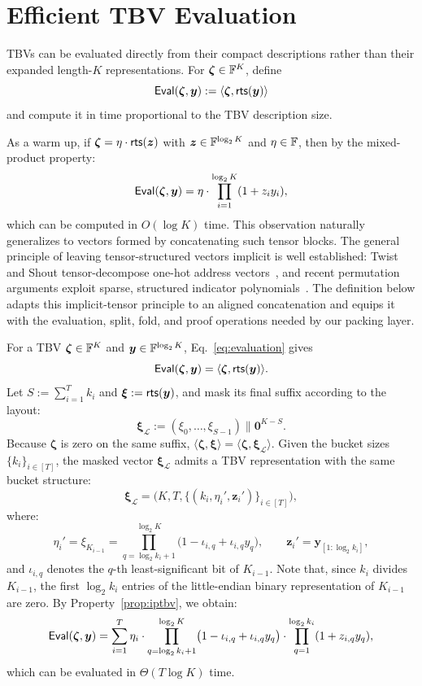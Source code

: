 \section{Efficient TBV Evaluation}
\label{sec:tbveval}

TBVs can be evaluated directly from their compact descriptions rather than
their expanded length-$K$ representations.  For
$\bm{\zeta}\in{\mathbb{F}}^K$, define
\[
{\sf Eval}(\bm{\zeta},\bm{y})
:= \langle \bm{\zeta}, {\sf rts}(\bm{y}) \rangle
\]
and compute it in time proportional to the TBV description size.

As a warm up, if $\bm{\zeta}=\eta\cdot{\sf rts}(\bm{z})$ with
$\bm{z}\in{\mathbb{F}}^{\log_2 K}$ and $\eta\in{\mathbb{F}}$, then by the mixed-product property:
\[
{\sf Eval}(\bm{\zeta},\bm{y})
=
\eta\cdot\prod_{i=1}^{\log_2 K}(1+z_i y_i),
\]
which can be computed in $O(\log K)$ time.
This observation naturally generalizes to vectors formed by concatenating such
tensor blocks.  The general principle of leaving tensor-structured vectors
implicit is well established: Twist and Shout tensor-decompose one-hot address
vectors~\cite{iacr/SettyT25}, and recent permutation arguments exploit sparse,
structured indicator polynomials~\cite{iacr/BunzCDC25}.  The definition below
adapts this implicit-tensor principle to an aligned concatenation and equips it
with the evaluation, split, fold, and proof operations needed by our packing
layer.

For a TBV $\bm{\zeta}\in{\mathbb{F}}^K$ and
$\bm{y}\in{\mathbb{F}}^{\log_2 K}$, Eq.~\eqref{eq:evaluation} gives
\[
{\sf Eval}(\bm{\zeta},\bm{y})
=
\langle \bm{\zeta}, {\sf rts}(\bm{y}) \rangle .
\]
Let $S:=\sum_{i=1}^T k_i$ and $\bm{\xi}:={\sf rts}(\bm{y})$, and mask its
final suffix according to the layout:
\[
  \bm\xi_{\mathcal L}:=(\xi_0,\ldots,\xi_{S-1})\|\bm{0}^{K-S}.
\]
Because $\bm\zeta$ is zero on the same suffix,
$\langle\bm\zeta,\bm\xi\rangle
=\langle\bm\zeta,\bm\xi_{\mathcal L}\rangle$.
Given the bucket sizes $\{k_i\}_{i\in[T]}$, the masked vector
$\bm\xi_{\mathcal L}$ admits a TBV representation with the same bucket
structure:
\[
\bm{\xi}_{\mathcal L}
=
\big(K,T,\{(k_i,\eta_i',\bm{z}_i')\}_{i\in[T]}\big),
\]
where:
\[
\eta_i'
=
\xi_{K_{i-1}}
=
\prod_{q=\log_2 k_i+1}^{\log_2 K}
\bigl(1-\iota_{i,q}+\iota_{i,q}y_q\bigr),
\qquad
\bm{z}_i'=\bm{y}_{[1:\log_2 k_i]},
\]
and $\iota_{i,q}$ denotes the $q$-th least-significant bit of $K_{i-1}$.
Note that, since $k_i$ divides $K_{i-1}$, the first $\log_2 k_i$ entries of the
little-endian binary representation of $K_{i-1}$ are zero.
By Property~\ref{prop:iptbv}, we obtain:
\begin{equation}
\label{eq:tbveval}
{\sf Eval}(\bm{\zeta},\bm{y})
=
\sum_{i=1}^T
\eta_i
\cdot
\prod_{q=\log_2 k_i+1}^{\log_2 K}
\bigl(1-\iota_{i,q}+\iota_{i,q}y_q\bigr)
\cdot
\prod_{q=1}^{\log_2 k_i}(1+z_{i,q}y_q),
\end{equation}
which can be evaluated in $\Theta(T\log K)$ time.
